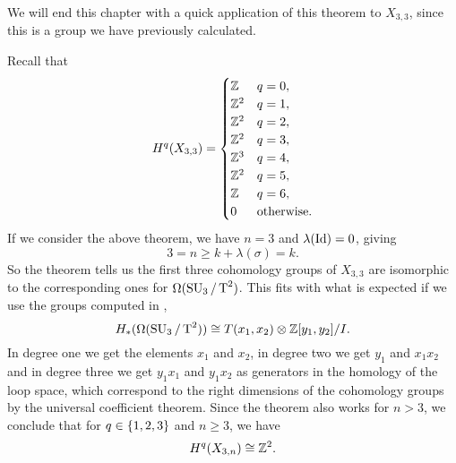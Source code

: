We will end this chapter with a quick application of this theorem to
$X_{3,3}$, since this is a group we have previously calculated.

\begin{example}
  Recall that
  \[ H^q(X_{3,3}) = \begin{cases}
    \mathbb{Z} & q = 0, \\
    \mathbb{Z}^{2} & q=1, \\
    \mathbb{Z}^{2} & q=2, \\
    \mathbb{Z}^{2} & q=3, \\
    \mathbb{Z}^{3} & q=4, \\
    \mathbb{Z}^{2} & q=5, \\
    \mathbb{Z} & q=6, \\
    0 & \text{otherwise}.
  \end{cases} \]
  If we consider the above theorem, we have $n = 3$ and
  $\lambda(\operatorname{Id}) = 0$, giving
  \[ 3 = n \geq k +\lambda(\sigma) = k. \]
  So the theorem tells us the first three cohomology groups of
  $X_{3,3}$ are isomorphic to the corresponding ones for
  $\Omega(\operatorname{SU}_3/\operatorname{T}^2)$.
  This fits with what is expected if we use the groups computed in
  \cite{grbic},
  \[ H_*(\Omega(\operatorname{SU}_3/\operatorname{T}^2)) \cong T(x_1,x_{2}) \otimes
  \mathbb{Z}[y_1,y_{2}]/I. \]
  In degree one we get the elements $x_1$ and $x_2$, in degree two we
  get $y_1$ and $x_1 x_2$ and in degree three we get $y_1 x_1$ and
  $y_1 x_2$ as generators in the homology of the loop space, which
  correspond to the right dimensions of the cohomology groups by the
  universal coefficient theorem. Since the theorem also works for $n >
  3$, we conclude that for $q\in \left\{ 1,2,3 \right\}$ and $n\geq 3$, we have
  \[ H^q(X_{3,n}) \cong \mathbb{Z}^2. \]
\end{example}


